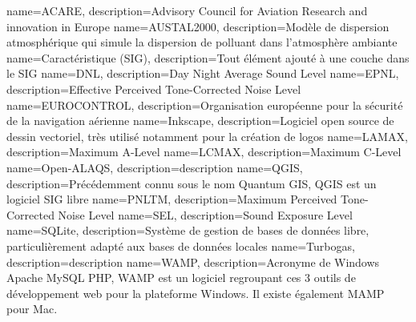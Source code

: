 {
	name={ACARE},
	description={Advisory Council for Aviation Research and innovation in Europe}
}
{
	name={AUSTAL2000},
	description={Modèle de dispersion atmosphérique qui simule la dispersion de polluant dans l'atmosphère ambiante}
}
{
	name={Caractéristique (SIG)},
	description={Tout élément ajouté à une couche dans le SIG}
}
{
    name={DNL},
    description={Day Night Average Sound Level}
}
{
    name={EPNL},
    description={Effective Perceived Tone-Corrected Noise Level}
}
{
	name={EUROCONTROL},
	description={Organisation européenne pour la sécurité de la navigation aérienne}
}
{
	name={Inkscape},
	description={Logiciel open source de dessin vectoriel, très utilisé notamment pour la création de logos}
}
{
    name={LAMAX},
    description={Maximum A-Level}
}
{
    name={LCMAX},
    description={Maximum C-Level}
}
{
	name={Open-ALAQS},
	description={description}
}
{
	name={QGIS},
	description={Précédemment connu sous le nom Quantum GIS, QGIS est un logiciel SIG libre}
}
{
    name={PNLTM},
    description={Maximum Perceived Tone-Corrected Noise Level}
}
{
    name={SEL},
    description={Sound Exposure Level}
}
{
	name={SQLite},
	description={Système de gestion de bases de données libre, particulièrement adapté aux bases de données locales}
}
{
	name={Turbogas},
	description={description}
}
{
	name={WAMP},
	description={Acronyme de Windows Apache MySQL PHP, WAMP est un logiciel regroupant ces 3 outils de développement web pour la plateforme Windows. Il existe également MAMP pour Mac.}
}
